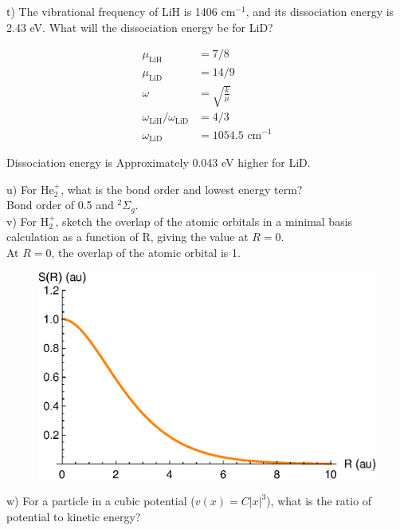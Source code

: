 \documentclass{article}
\begin{document}
\noindent t) The vibrational frequency of LiH is 1406 cm$^{-1}$, and its dissociation
energy is 2.43 eV. What will the dissociation energy be for LiD?
\\

{\color{blue}
  \begin{align*}
    \mu_{\text{LiH}} & = 7/8 \\
    \mu_{\text{LiD}} & = 14/9 \\
    \omega & = \sqrt{\frac{k}{\mu}} \\
    \omega_{\text{LiH}}/\omega_{\text{LiD}} & = 4/3 \\
    \omega_{\text{LiD}} & = 1054.5 \text{ cm}^{-1}
  \end{align*}

  Dissociation energy is Approximately 0.043 eV higher for LiD.
}

\noindent u) For He$_2^+$, what is the bond order and lowest energy term?
\\

{\color{blue} Bond order of 0.5 and $^2\Sigma_g$.}
\\

\noindent v) For H$_2^+$, sketch the overlap of the atomic orbitals in a minimal basis
calculation as a function of R, giving the value at $R=0$.
\\

{\color{blue} At $R=0$, the overlap of the atomic orbital is 1.}
\begin{figure}[H]
  \centering
  \includegraphics[scale=0.75]{h2.eps}
  \label{fig:overlap}
\end{figure}

\noindent w) For a particle in a cubic potential ($v(x) = C|x|^3$), what is the ratio
of potential to kinetic energy?
\\
\end{document}
